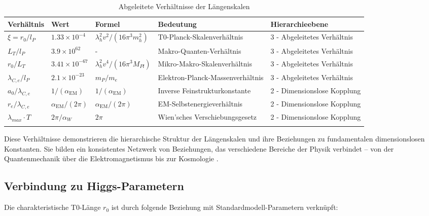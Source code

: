 \documentclass[12pt,a4paper]{article}
\newcommand{\alphaEM}{\alpha_{\text{EM}}}
\begin{document}
	\begin{table}[ht]
		\centering
		\begin{adjustbox}{scale=0.75}
			\begin{tabular}{lllll}
				\hline
				\textbf{Verhältnis} & \textbf{Wert} & \textbf{Formel} & \textbf{Bedeutung} & \textbf{Hierarchieebene} \\
				\hline
				$\xi = r_0/l_P$ & $1.33 \times 10^{-4}$ & $\lambda_h^2v^2/(16\pi^3m_h^2)$ & T0-Planck-Skalenverhältnis & 3 - Abgeleitetes Verhältnis \\
				$L_T/l_P$ & $3.9 \times 10^{62}$ & - & Makro-Quanten-Verhältnis & 3 - Abgeleitetes Verhältnis \\
				$r_0/L_T$ & $3.41 \times 10^{-67}$ & $\lambda_h^2v^4/(16\pi^3M_{Pl})$ & Mikro-Makro-Skalenverhältnis & 3 - Abgeleitetes Verhältnis \\
				$\lambda_{C,e}/l_P$ & $2.1 \times 10^{-23}$ & $m_P/m_e$ & Elektron-Planck-Massenverhältnis & 3 - Abgeleitetes Verhältnis \\
				$a_0/\lambda_{C,e}$ & $1/(\alphaEM)$ & $1/(\alphaEM)$ & Inverse Feinstrukturkonstante & 2 - Dimensionslose Kopplung \\
				$r_e/\lambda_{C,e}$ & $\alphaEM/(2\pi)$ & $\alphaEM/(2\pi)$ & EM-Selbstenergieverhältnis & 2 - Dimensionslose Kopplung \\
				$\lambda_{max} \cdot T$ & $2\pi/\alpha_W$ & $2\pi$ & Wien’sches Verschiebungsgesetz & 2 - Dimensionslose Kopplung \\
				\hline
				\multicolumn{4}{c}{} \\
				\hline
			\end{tabular}
		\end{adjustbox}
		\caption{Abgeleitete Verhältnisse der Längenskalen}
		\label{tab:length_ratios}
	\end{table}
	
	Diese Verhältnisse demonstrieren die hierarchische Struktur der Längenskalen und ihre Beziehungen zu fundamentalen dimensionslosen Konstanten. Sie bilden ein konsistentes Netzwerk von Beziehungen, das verschiedene Bereiche der Physik verbindet – von der Quantenmechanik über die Elektromagnetismus bis zur Kosmologie \cite{pascher_planck_2025}.
	
	\subsection{Verbindung zu Higgs-Parametern}
	
	Die charakteristische T0-Länge $r_0$ ist durch folgende Beziehung mit Standardmodell-Parametern verknüpft:
	
\end{document}
